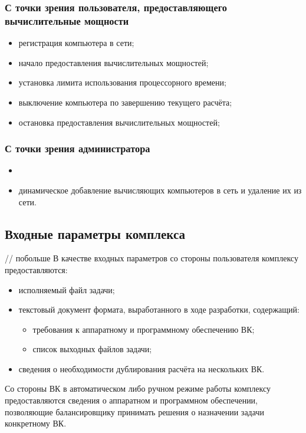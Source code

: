 \documentclass[a4paper,12pt]{report}
\numberwithin{equation}{section}
\begin{document}
\subsubsection{С точки зрения пользователя, предоставляющего вычислительные мощности}
\begin{itemize}
  \item регистрация компьютера в сети;
  \item начало предоставления вычислительных мощностей;
  \item установка лимита использования процессорного времени;
  \item выключение компьютера по завершению текущего расчёта;
  \item остановка предоставления вычислительных мощностей;
\end{itemize}

\subsubsection{С точки зрения администратора}
\begin{itemize}
  \item 
  \item динамическое добавление вычисляющих компьютеров в сеть и удаление их из сети.
\end{itemize}


\subsection{Входные параметры комплекса}
// побольше
В качестве входных параметров со стороны пользователя комплексу предоставляются:
\begin{itemize}
  \item исполняемый файл задачи;
  \item текстовый документ формата, выработанного в ходе разработки, содержащий: 
  	\begin{itemize}
  	  \item требования к аппаратному и программному обеспечению ВК;
  	  \item список выходных файлов задачи;
  	\end{itemize}
  \item сведения о необходимости дублирования расчёта на нескольких ВК.
\end{itemize}

Со стороны ВК в автоматическом либо ручном режиме работы комплексу предоставляются сведения о аппаратном и программном обеспечении, 
позволяющие балансировщику принимать решения о назначении задачи конкретному ВК.
\end{document}
